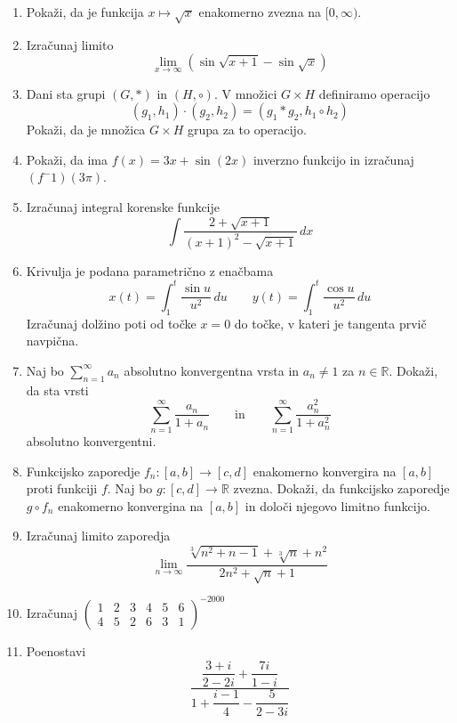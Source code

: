 \documentclass[a4paper,12pt]{article}
\newcommand{\numR}{\mathbb{R}}
\begin{document}
\begin{enumerate}
\item
Pokaži, da je funkcija $x \mapsto \sqrt{x}$ enakomerno zvezna na $[0, \infty)$.

\item
Izračunaj limito
\[
    \lim_{x \to \infty} (\sin \sqrt{x + 1} - \sin \sqrt{x})    
\]

\item
Dani sta grupi $(G,\ast)$ in $(H, \circ)$. V množici $G \times H$ definiramo operacijo
\[
    (g_1, h_1) \cdot (g_2, h_2) = (g_1 \ast g_2, h_1 \circ h_2)
\]
Pokaži, da je množica $G \times H$ grupa za to operacijo.

\item
Pokaži, da ima $f(x) = 3x + \sin(2x)$ inverzno funkcijo in izračunaj $(f^-1)(3\pi)$.

\item
Izračunaj integral korenske funkcije
\[
    \int \frac{2 + \sqrt{x + 1}}{(x + 1)^2 - \sqrt{x + 1}}\,dx    
\]

\item
Krivulja je podana parametrično z enačbama
\[
    x(t) = \int_{1}^{t} \frac{\sin u}{u^2}\,du \qquad
    y(t) = \int_{1}^{t} \frac{\cos u}{u^2}\,du
\]
Izračunaj dolžino poti od točke $x = 0$ do točke, v kateri je tangenta prvič navpična.

\item
Naj bo $\sum_{n = 1}^{\infty} a_n$ absolutno konvergentna vrsta in $a_n \neq 1$ za $n \in \numR$.
Dokaži, da sta vrsti
\[
    \sum_{n = 1}^{\infty} \frac{a_n}{1 + a_n} \qquad \text{in} \qquad
    \sum_{n = 1}^{\infty} \frac{a_{n}^{2}}{1 + a_{n}^{2}}
\]
absolutno konvergentni.

\item
Funkcijsko zaporedje $f_n : [a, b] \to [c, d]$ enakomerno konvergira na $[a, b]$ proti
funkciji $f$. Naj bo $g : [c, d] \to \numR$ zvezna. Dokaži, da funkcijsko zaporedje
$g \circ f_n$ enakomerno konvergina na $[a, b]$ in določi njegovo limitno funkcijo.

\item
Izračunaj limito zaporedja
\[
    \lim_{n \to \infty} \frac{\sqrt[3]{n^2 + n -1} + \sqrt[3]{n} + n^2}{2n^2 + \sqrt{n} + 1}
\]

\item
Izračunaj
$
\begin{pmatrix}
    1 & 2 & 3 & 4 & 5 & 6\\
    4 & 5 & 2 & 6 & 3 & 1
\end{pmatrix}^{-2000}
$

\item
Poenostavi
\[
    \frac{
        \dfrac{3 + i}{2 - 2i} + \dfrac{7i}{1-i}
    }{
        1 + \dfrac{i-1}{4} - \dfrac{5}{2-3i}
    }    
\]


\end{enumerate}
\end{document}
